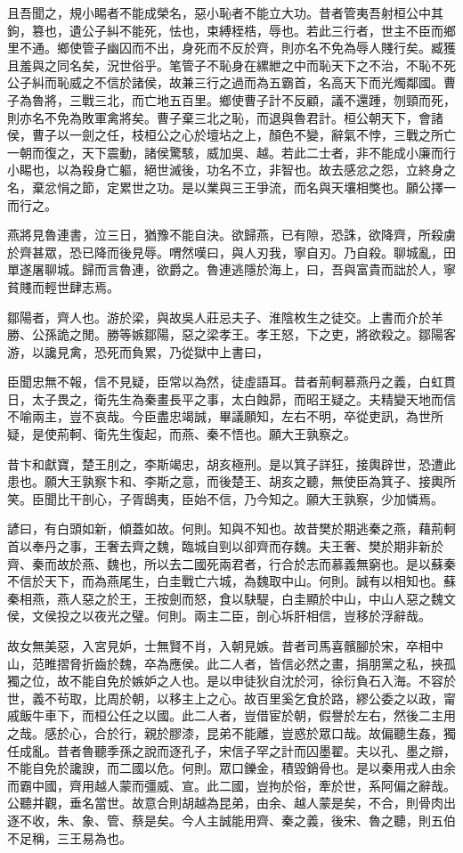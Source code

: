 且吾聞之，規小睗者不能成榮名，惡小恥者不能立大功。昔者管夷吾射桓公中其鉤，篡也，遺公子糾不能死，怯也，束縛桎梏，辱也。若此三行者，世主不臣而鄉里不通。鄉使管子幽囚而不出，身死而不反於齊，則亦名不免為辱人賤行矣。臧獲且羞與之同名矣，況世俗乎。笔管子不恥身在縲紲之中而恥天下之不治，不恥不死公子糾而恥威之不信於諸侯，故兼三行之過而為五霸首，名高天下而光燭鄰國。曹子為魯將，三戰三北，而亡地五百里。鄉使曹子計不反顧，議不還踵，刎頸而死，則亦名不免為敗軍禽將矣。曹子棄三北之恥，而退與魯君計。桓公朝天下，會諸侯，曹子以一劍之任，枝桓公之心於壇坫之上，顏色不變，辭氣不悖，三戰之所亡一朝而復之，天下震動，諸侯驚駭，威加吳、越。若此二士者，非不能成小廉而行小睗也，以為殺身亡軀，絕世滅後，功名不立，非智也。故去感忿之怨，立終身之名，棄忿悁之節，定累世之功。是以業與三王爭流，而名與天壤相獘也。願公擇一而行之。

燕將見魯連書，泣三日，猶豫不能自決。欲歸燕，已有隙，恐誅，欲降齊，所殺虜於齊甚眾，恐已降而後見辱。喟然嘆曰，與人刃我，寧自刃。乃自殺。聊城亂，田單遂屠聊城。歸而言魯連，欲爵之。魯連逃隱於海上，曰，吾與富貴而詘於人，寧貧賤而輕世肆志焉。

鄒陽者，齊人也。游於梁，與故吳人莊忌夫子、淮陰枚生之徒交。上書而介於羊勝、公孫詭之閒。勝等嫉鄒陽，惡之梁孝王。孝王怒，下之吏，將欲殺之。鄒陽客游，以讒見禽，恐死而負累，乃從獄中上書曰，

臣聞忠無不報，信不見疑，臣常以為然，徒虛語耳。昔者荊軻慕燕丹之義，白虹貫日，太子畏之，衛先生為秦畫長平之事，太白蝕昴，而昭王疑之。夫精變天地而信不喻兩主，豈不哀哉。今臣盡忠竭誠，畢議願知，左右不明，卒從吏訊，為世所疑，是使荊軻、衛先生復起，而燕、秦不悟也。願大王孰察之。

昔卞和獻寶，楚王刖之，李斯竭忠，胡亥極刑。是以箕子詳狂，接輿辟世，恐遭此患也。願大王孰察卞和、李斯之意，而後楚王、胡亥之聽，無使臣為箕子、接輿所笑。臣聞比干剖心，子胥鴟夷，臣始不信，乃今知之。願大王孰察，少加憐焉。

諺曰，有白頭如新，傾蓋如故。何則。知與不知也。故昔樊於期逃秦之燕，藉荊軻首以奉丹之事，王奢去齊之魏，臨城自剄以卻齊而存魏。夫王奢、樊於期非新於齊、秦而故於燕、魏也，所以去二國死兩君者，行合於志而慕義無窮也。是以蘇秦不信於天下，而為燕尾生，白圭戰亡六城，為魏取中山。何則。誠有以相知也。蘇秦相燕，燕人惡之於王，王按劍而怒，食以駃騠，白圭顯於中山，中山人惡之魏文侯，文侯投之以夜光之璧。何則。兩主二臣，剖心坼肝相信，豈移於浮辭哉。

故女無美惡，入宮見妒，士無賢不肖，入朝見嫉。昔者司馬喜髕腳於宋，卒相中山，范睢摺脅折齒於魏，卒為應侯。此二人者，皆信必然之畫，捐朋黨之私，挾孤獨之位，故不能自免於嫉妒之人也。是以申徒狄自沈於河，徐衍負石入海。不容於世，義不茍取，比周於朝，以移主上之心。故百里奚乞食於路，繆公委之以政，甯戚飯牛車下，而桓公任之以國。此二人者，豈借宦於朝，假譽於左右，然後二主用之哉。感於心，合於行，親於膠漆，昆弟不能離，豈惑於眾口哉。故偏聽生姦，獨任成亂。昔者魯聽季孫之說而逐孔子，宋信子罕之計而囚墨翟。夫以孔、墨之辯，不能自免於讒諛，而二國以危。何則。眾口鑠金，積毀銷骨也。是以秦用戎人由余而霸中國，齊用越人蒙而彊威、宣。此二國，豈拘於俗，牽於世，系阿偏之辭哉。公聽并觀，垂名當世。故意合則胡越為昆弟，由余、越人蒙是矣，不合，則骨肉出逐不收，朱、象、管、蔡是矣。今人主誠能用齊、秦之義，後宋、魯之聽，則五伯不足稱，三王易為也。

